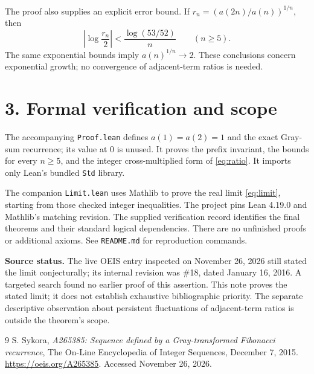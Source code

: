 \documentclass[11pt]{article}
\begin{document}
The proof also supplies an explicit error bound. If $r_n=(a(2n)/a(n))^{1/n}$, then
\[
 \left|\log\frac{r_n}{2}\right|<\frac{\log(53/52)}{n}\qquad(n\ge5).
\]
The same exponential bounds imply $a(n)^{1/n}\to2$. These conclusions concern exponential growth; no convergence of adjacent-term ratios is needed.

\section*{3. Formal verification and scope}
The accompanying \texttt{Proof.lean} defines $a(1)=a(2)=1$ and the exact Gray-sum recurrence; its value at $0$ is unused. It proves the prefix invariant, the bounds for every $n\ge5$, and the integer cross-multiplied form of \eqref{eq:ratio}. It imports only Lean's bundled \texttt{Std} library.

The companion \texttt{Limit.lean} uses Mathlib to prove the real limit \eqref{eq:limit}, starting from those checked integer inequalities. The project pins Lean 4.19.0 and Mathlib's matching revision. The supplied verification record identifies the final theorems and their standard logical dependencies. There are no unfinished proofs or additional axioms. See \texttt{README.md} for reproduction commands.

\textbf{Source status.} The live OEIS entry inspected on November 26, 2026 still stated the limit conjecturally; its internal revision was \#18, dated January 16, 2016. A targeted search found no earlier proof of this assertion. This note proves the stated limit; it does not establish exhaustive bibliographic priority. The separate descriptive observation about persistent fluctuations of adjacent-term ratios is outside the theorem's scope.

\begin{thebibliography}{9}
S. Sykora, \emph{A265385: Sequence defined by a Gray-transformed Fibonacci recurrence}, The On-Line Encyclopedia of Integer Sequences, December 7, 2015. \url{https://oeis.org/A265385}. Accessed November 26, 2026.
\end{thebibliography}
\end{document}
